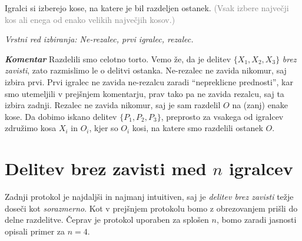 \documentclass[a4paper,12pt]{article}
\begin{document}
\begin{protokol}
\item Igralci si izberejo kose, na katere je bil razdeljen ostanek. \textcolor{gray}{(Vsak izbere največji kos ali enega od enako velikih največjih kosov.)}

\textsl{Vrstni red izbiranja: Ne-rezalec, prvi igralec, rezalec.}

\item [\textbf{\em Komentar}] Razdelili smo celotno torto. Vemo že, da je delitev ${\{X_1, X_2, X_3\}}$ {\em brez zavisti}, zato razmislimo le o delitvi ostanka. Ne-rezalec ne zavida nikomur, saj izbira prvi. Prvi igralec ne zavida ne-rezalcu zaradi ``nepreklicne prednosti'', kar smo utemeljili v prejšnjem komentarju, prav tako pa ne zavida rezalcu, saj ta izbira zadnji. Rezalec ne zavida nikomur, saj je sam razdelil $O$ na (zanj) enake kose. Da dobimo iskano delitev ${\{P_1, P_2, P_3\}}$, preprosto za vsakega od igralcev združimo kosa $X_i$ in $O_i$, kjer so $O_i$ kosi, na katere smo razdelili ostanek $O$.

\end{protokol}

\section{Delitev brez zavisti med $n$ igralcev}

Zadnji protokol je najdaljši in najmanj intuitiven, saj je {\em delitev brez zavisti} težje doseči kot {\em sorazmerno}. Kot v prejšnjem protokolu bomo z obrezovanjem prišli do delne razdelitve.
Čeprav je protokol uporaben za splošen $n$, bomo zaradi jasnosti opisali primer za $n = 4$. 

\end{document}
